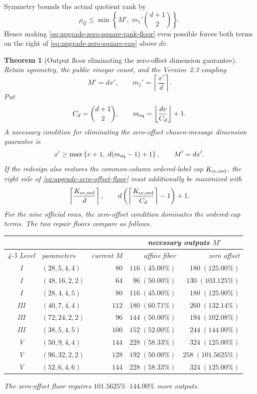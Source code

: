 \documentclass[11pt]{article}
\newtheorem{theorem}{Theorem}[section]
\begin{document}
Symmetry bounds the actual quotient rank by
\begin{equation}
 \rho_Q\le \min\left\{M',\;m_1'\binom{d+1}{2}\right\}.
                                                               \label{eq:upgrade-zero-square-cap}
\end{equation}
Hence making \eqref{eq:upgrade-zero-square-rank-floor} even possible forces
both terms on the right of \eqref{eq:upgrade-zero-square-cap} above $dv$.

\begin{theorem}[Output floor eliminating the zero-offset dimension guarantee]
\label{thm:upgrade-zero-offset-floor}
Retain symmetry, the public vinegar count, and the Version~2.3 coupling
\[
 M'=dx',\qquad m_1'=\left\lceil\frac{x'}d\right\rceil.
\]
Put
\[
 C_d=\binom{d+1}{2},
 \qquad
 m_{\rm sq}=\left\lfloor\frac{dv}{C_d}\right\rfloor+1.
\]
A necessary condition for eliminating the zero-offset chosen-message
dimension guarantee is
\begin{equation}
 x'\ge
 \max\left\{v+1,\;d(m_{\rm sq}-1)+1\right\},
 \qquad M'=dx'.                                        \label{eq:upgrade-zero-offset-floor}
\end{equation}
If the redesign also restores the common-column ordered-label cap
$K_{\rm cc,ord}$, the
right side of \eqref{eq:upgrade-zero-offset-floor} must additionally be
maximized with
\[
  \left\lceil\frac{K_{\rm cc,ord}}d\right\rceil,
 \qquad
  d\left(\left\lceil\frac{K_{\rm cc,ord}}{C_d}\right\rceil-1\right)+1.
\]
For the nine official rows, the zero-offset condition dominates the ordered-cap
terms.  The two repair floors compare as follows.
\begin{center}
\small
\begin{tabular}{@{}c l r r r@{}}
\toprule
&&& \multicolumn{2}{c}{necessary outputs $M'$}\\
\cmidrule(l){4-5}
Level & parameters & current $M$ & affine fiber & zero offset\\
\midrule
I   & $(28,5,4,4)$  & $80$  & $116\;(45.00\%)$ & $180\;(125.00\%)$\\
I   & $(48,16,2,2)$ & $64$  & $96\;(50.00\%)$ & $130\;(103.125\%)$\\
I   & $(28,4,4,5)$  & $80$  & $116\;(45.00\%)$ & $180\;(125.00\%)$\\
III & $(40,7,4,4)$  & $112$ & $180\;(60.71\%)$ & $260\;(132.14\%)$\\
III & $(72,24,2,2)$ & $96$  & $144\;(50.00\%)$ & $194\;(102.08\%)$\\
III & $(38,5,4,5)$  & $100$ & $152\;(52.00\%)$ & $244\;(144.00\%)$\\
V   & $(50,9,4,4)$  & $144$ & $228\;(58.33\%)$ & $324\;(125.00\%)$\\
V   & $(96,32,2,2)$ & $128$ & $192\;(50.00\%)$ & $258\;(101.5625\%)$\\
V   & $(52,6,4,6)$  & $144$ & $228\;(58.33\%)$ & $324\;(125.00\%)$\\
\bottomrule
\end{tabular}
\end{center}
The zero-offset floor requires $101.5625\%$--$144.00\%$ more outputs.
\end{theorem}
\end{document}
